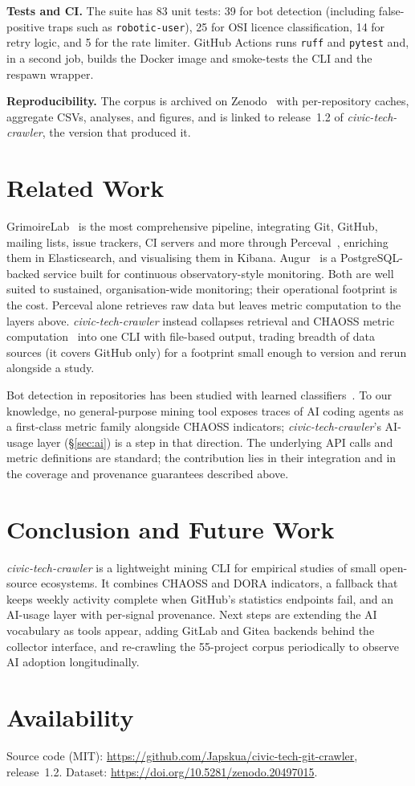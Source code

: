 \documentclass[10pt,conference]{IEEEtran}
\newcommand{\tool}{\textit{civic-tech-crawler}}
\begin{document}
\textbf{Tests and CI.} The suite has 83 unit tests: 39 for bot detection (including false-positive traps such as \texttt{robotic-user}), 25 for OSI licence classification, 14 for retry logic, and 5 for the rate limiter. GitHub Actions runs \texttt{ruff} and \texttt{pytest} and, in a second job, builds the Docker image and smoke-tests the CLI and the respawn wrapper.

\textbf{Reproducibility.} The corpus is archived on Zenodo~\cite{zenodo-dataset} with per-repository caches, aggregate CSVs, analyses, and figures, and is linked to release~1.2 of \tool{}, the version that produced it.

\section{Related Work}

GrimoireLab~\cite{grimoirelab} is the most comprehensive pipeline, integrating Git, GitHub, mailing lists, issue trackers, CI servers and more through Perceval~\cite{perceval}, enriching them in Elasticsearch, and visualising them in Kibana. Augur~\cite{augur} is a PostgreSQL-backed service built for continuous observatory-style monitoring. Both are well suited to sustained, organisation-wide monitoring; their operational footprint is the cost. Perceval alone retrieves raw data but leaves metric computation to the layers above. \tool{} instead collapses retrieval and CHAOSS metric computation~\cite{chaoss,truck} into one CLI with file-based output, trading breadth of data sources (it covers GitHub only) for a footprint small enough to version and rerun alongside a study.

Bot detection in repositories has been studied with learned classifiers~\cite{golzadeh-bots}. To our knowledge, no general-purpose mining tool exposes traces of AI coding agents as a first-class metric family alongside CHAOSS indicators; \tool{}'s AI-usage layer (\S\ref{sec:ai}) is a step in that direction. The underlying API calls and metric definitions are standard; the contribution lies in their integration and in the coverage and provenance guarantees described above.

\section{Conclusion and Future Work}

\tool{} is a lightweight mining CLI for empirical studies of small open-source ecosystems. It combines CHAOSS and DORA indicators, a fallback that keeps weekly activity complete when GitHub's statistics endpoints fail, and an AI-usage layer with per-signal provenance. Next steps are extending the AI vocabulary as tools appear, adding GitLab and Gitea backends behind the collector interface, and re-crawling the 55-project corpus periodically to observe AI adoption longitudinally.

\section*{Availability}

Source code (MIT): \url{https://github.com/Japskua/civic-tech-git-crawler}, release~1.2. Dataset: \url{https://doi.org/10.5281/zenodo.20497015}.



\end{document}
